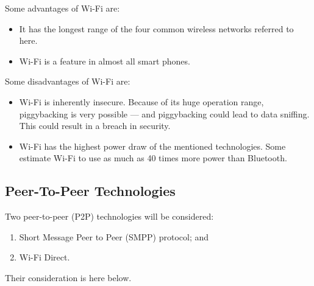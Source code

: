\documentclass[12pt,svgnames,smaller]{article} %
\begin{document}
\begin{enumerate}
		Some advantages of Wi-Fi are:
		
		\begin{itemize}
			\item It has the longest range of the four common wireless networks referred to here.
			\item Wi-Fi is a feature in almost all smart phones.
		\end{itemize}
		
		Some disadvantages of Wi-Fi are:
		
		\begin{itemize}
			\item Wi-Fi is inherently insecure. Because of its huge operation range, piggybacking is very possible --- and piggybacking could lead to data sniffing. This could result in a breach in security.
			\item Wi-Fi has the highest power draw of the mentioned technologies. Some estimate Wi-Fi to use as much as 40 times more power than Bluetooth.
		\end{itemize}
		
	\end{enumerate}
	
	\subsection{\textbf{Peer-To-Peer Technologies}}
	
	Two peer-to-peer (P2P) technologies will be considered:
	
	\begin{enumerate}
		\item Short Message Peer to Peer (SMPP) protocol; and 
		\item Wi-Fi Direct.
	\end{enumerate}
	
	Their consideration is here below.
	
\end{document}
